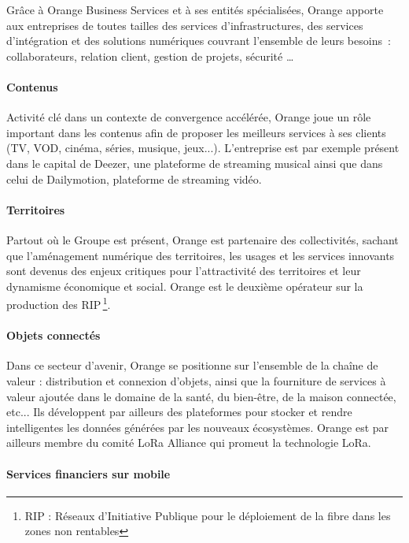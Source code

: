             Grâce à Orange Business Services et à ses entités spécialisées, Orange apporte aux entreprises de toutes tailles des services d’infrastructures, des services d’intégration et des solutions numériques couvrant l’ensemble de leurs besoins : collaborateurs, relation client, gestion de projets, sécurité …

            \paragraph{Contenus}

            Activité clé dans un contexte de convergence accélérée, Orange joue un rôle important dans les contenus afin de proposer les meilleurs services à ses clients (TV, VOD, cinéma, séries, musique, jeux...).
            L’entreprise est par exemple présent dans le capital de Deezer, une plateforme de streaming musical ainsi que dans celui de Dailymotion, plateforme de streaming vidéo.

            \paragraph{Territoires}

            Partout où le Groupe est présent, Orange est partenaire des collectivités, sachant que l’aménagement numérique des territoires, les usages et les services innovants sont devenus des enjeux critiques pour l’attractivité des territoires et leur dynamisme économique et social.
            Orange est le deuxième opérateur sur la production des RIP\,\footnote{RIP : Réseaux d’Initiative Publique pour le déploiement de la fibre dans les zones non rentables}.

            \paragraph{Objets connectés}

            Dans ce secteur d’avenir, Orange se positionne sur l’ensemble de la chaîne de valeur : distribution et connexion d’objets, ainsi que la fourniture de services à valeur ajoutée dans le domaine de la santé, du bien-être, de la maison connectée, etc...
            Ils développent par ailleurs des plateformes pour stocker et rendre intelligentes les données générées par les nouveaux écosystèmes.
            Orange est par ailleurs membre du comité LoRa Alliance qui promeut la technologie LoRa.

            \paragraph{Services financiers sur mobile}

